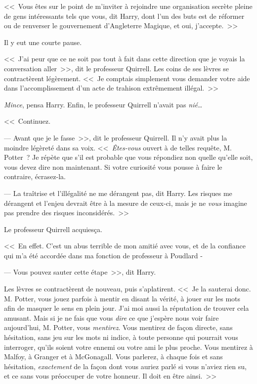 <<~Vous êtes sur le point de m'inviter à rejoindre une organisation secrète pleine de gens intéressants tels que vous, dit Harry, dont l'un des buts est de réformer ou de renverser le gouvernement d'Angleterre Magique, et oui, j'accepte.~>>

Il y eut une courte pause.

<<~J'ai peur que ce ne soit pas tout à fait dans cette direction que je voyais la conversation aller~>>, dit le professeur Quirrell. Les coins de ses lèvres se contractèrent légèrement. <<~Je comptais simplement vous demander votre aide dans l'accomplissement d'un acte de trahison extrêmement illégal.~>>

\emph{Mince}, pensa Harry. Enfin, le professeur Quirrell n'avait pas \emph{nié}…

<<~Continuez.

--- Avant que je le fasse~>>, dit le professeur Quirrell. Il n'y avait plus la moindre légèreté dans sa voix. <<~\emph{Êtes-vous} ouvert à de telles requête, M. Potter~? Je répète que s'il est probable que vous répondiez non quelle qu'elle soit, vous devez dire non maintenant. Si votre curiosité vous pousse à faire le contraire, écrasez-la.

--- La traîtrise et l'illégalité ne me dérangent pas, dit Harry. Les risques me dérangent et l'enjeu devrait être à la mesure de ceux-ci, mais je ne \emph{vous} imagine pas prendre des risques inconsidérés.~>>

Le professeur Quirrell acquiesça.

<<~En effet. C'est un abus terrible de mon amitié avec vous, et de la confiance qui m'a été accordée dans ma fonction de professeur à Poudlard -

--- Vous pouvez sauter cette étape~>>, dit Harry.

Les lèvres se contractèrent de nouveau, puis s'aplatirent. <<~Je la sauterai donc. M. Potter, vous jouez parfois à mentir en disant la vérité, à jouer sur les mots afin de masquer le sens en plein jour. J'ai moi aussi la réputation de trouver cela amusant. Mais si je ne fais que vous \emph{dire} ce que j'espère nous voir faire aujourd'hui, M. Potter, vous \emph{mentirez}. Vous mentirez de façon directe, sans hésitation, sans jeu sur les mots ni indice, à toute personne qui pourrait vous interroger, qu'ils soient votre ennemi ou votre ami le plus proche. Vous mentirez à Malfoy, à Granger et à McGonagall. Vous parlerez, à chaque fois et sans hésitation, \emph{exactement} de la façon dont vous auriez parlé si vous n'aviez rien su, et ce sans vous préoccuper de votre honneur. Il doit en être ainsi.~>>

